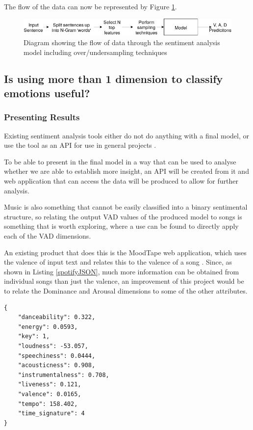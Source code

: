 The flow of the data can now be represented by Figure \ref{model:finalFlow}.

\begin{figure}[h]
\centering
\includegraphics[scale=0.5]{litImgs/finalmodelflow.png}
\caption{Diagram showing the flow of data through the sentiment analysis model including over/undersampling techniques}
\label{model:finalFlow}
\end{figure}


\subsection{Is using more than 1 dimension to classify emotions useful?}

\subsubsection{Presenting Results}

Existing sentiment analysis tools either do not do anything with a final model, or use the tool as an API for use in general projects \cite{sentimentAPI}.  

To be able to present in the final model in a way that can be used to analyse whether we are able to establish more insight, an API will be created from it and web application that can access the data will be produced to allow for further analysis.

Music is also something  that cannot be easily classified into a binary sentimental structure, so relating the output VAD values of the produced model to songs is something that is worth exploring, where a use can be found to directly apply each of the VAD dimensions.

An existing product that does this is the MoodTape web application, which uses the valence of input text and relates this to the valence of a song  \cite{moodtape}. Since, as shown in Listing \ref{spotifyJSON}, much more information can be obtained from individual songs than just the valence, an improvement of this project would be to relate the Dominance and Arousal dimensions to some of the other attributes.

\begin{lstlisting}[style=leftCode, caption={Some of the attributes of a song obtained through requesting information through the Spotify API},captionpos=b, label={spotifyJSON}]
{
    "danceability": 0.322,
    "energy": 0.0593,
    "key": 1,
    "loudness": -53.057,
    "speechiness": 0.0444,
    "acousticness": 0.908,
    "instrumentalness": 0.708,
    "liveness": 0.121,
    "valence": 0.0165,
    "tempo": 158.402,
    "time_signature": 4
}
\end{lstlisting}

